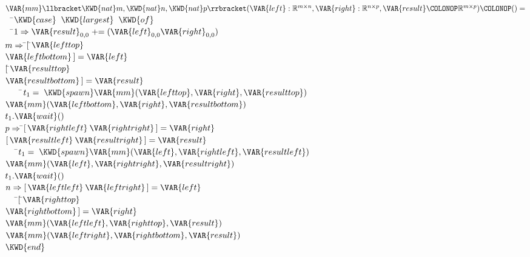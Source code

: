 \begin{Fortress}
\(\VAR{mm}\llbracket\KWD{nat} m, \KWD{nat} n, \KWD{nat} p\rrbracket(\VAR{left}  \mathrel{\mathtt{:}}\mathbb{R}^{m \times n}, \VAR{right} \mathrel{\mathtt{:}}\mathbb{R}^{n \times p}, \VAR{result}\COLONOP\mathbb{R}^{m \times p})\COLONOP() =\)\\
{\tt~~}\pushtabs\=\+\(  \KWD{case}\;\;\KWD{largest}\;\;\KWD{of}\)\\
{\tt~~}\pushtabs\=\+\(    1 \Rightarrow \VAR{result}_{0,0} \mathrel{+}= (\VAR{left}_{0,0} \VAR{right}_{0,0})\)\\
\(    m \Rightarrow \null\)\pushtabs\=\+\([\,\null\)\pushtabs\=\+\(\VAR{lefttop}\)\\
\(                    \VAR{leftbottom}  \,] = \VAR{left}\)\-\\\poptabs
\(                  [\,\null\)\pushtabs\=\+\(\VAR{resulttop} \)\\
\(                    \VAR{resultbottom}\,] = \VAR{result}\)\-\-\\\poptabs\poptabs
{\tt~~~~}\pushtabs\=\+\(        t_{1} = \;\KWD{spawn} \VAR{mm}(\VAR{lefttop}, \VAR{right}, \VAR{resulttop})\)\\
\(        \VAR{mm}(\VAR{leftbottom}, \VAR{right}, \VAR{resultbottom})\)\\
\(        t_{1}.\VAR{wait}()\)\-\\\poptabs
\(    p \Rightarrow \null\)\pushtabs\=\+\([\,\VAR{rightleft}\mskip 4mu plus 4mu\VAR{rightright} \,] = \VAR{right}\)\\
\(                  [\,\VAR{resultleft}\mskip 4mu plus 4mu\VAR{resultright}\,] = \VAR{result}\)\-\\\poptabs
{\tt~~~}\pushtabs\=\+\(        t_{1} = \;\KWD{spawn} \VAR{mm}(\VAR{left}, \VAR{rightleft}, \VAR{resultleft})\)\\
\(        \VAR{mm}(\VAR{left}, \VAR{rightright}, \VAR{resultright})\)\\
\(        t_{1}.\VAR{wait}()\)\-\\\poptabs
\(    n \Rightarrow [\,\VAR{leftleft}\mskip 4mu plus 4mu\VAR{leftright}\,] = \VAR{left}\)\\
{\tt\;~~~}\pushtabs\=\+\(         [\,\null\)\pushtabs\=\+\(\VAR{righttop}\)\\
\(           \VAR{rightbottom}\,] = \VAR{right}\)\-\\\poptabs
\(         \VAR{mm}(\VAR{leftleft} , \VAR{righttop}   , \VAR{result})\)\\
\(         \VAR{mm}(\VAR{leftright}, \VAR{rightbottom}, \VAR{result})\)\-\-\\\poptabs\poptabs
\(  \KWD{end}\)\-\\\poptabs
\end{Fortress}

